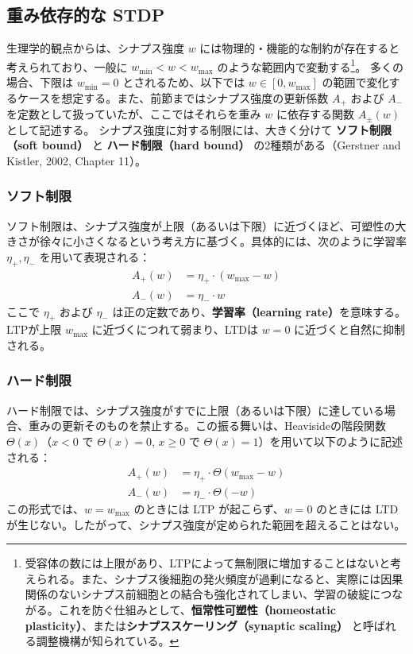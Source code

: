 \subsection{重み依存的な STDP}
生理学的観点からは、シナプス強度 $w$ には物理的・機能的な制約が存在すると考えられており、一般に $w_{\min} < w < w_{\max}$ のような範囲内で変動する\footnote{受容体の数には上限があり、LTPによって無制限に増加することはないと考えられる。また、シナプス後細胞の発火頻度が過剰になると、実際には因果関係のないシナプス前細胞との結合も強化されてしまい、学習の破綻につながる。これを防ぐ仕組みとして、\textbf{恒常性可塑性（homeostatic plasticity）}、または\textbf{シナプススケーリング（synaptic scaling）} と呼ばれる調整機構が知られている。}。
多くの場合、下限は $w_{\min} = 0$ とされるため、以下では $w \in [0, w_{\max}]$ の範囲で変化するケースを想定する。また、前節まではシナプス強度の更新係数 $A_+$ および $A_-$ を定数として扱っていたが、ここではそれらを重み $w$ に依存する関数 $A_{\pm}(w)$ として記述する。
シナプス強度に対する制限には、大きく分けて \textbf{ソフト制限（soft bound）} と \textbf{ハード制限（hard bound）} の2種類がある（Gerstner and Kistler, 2002, Chapter 11）。
\subsubsection{ソフト制限}
ソフト制限は、シナプス強度が上限（あるいは下限）に近づくほど、可塑性の大きさが徐々に小さくなるという考え方に基づく。具体的には、次のように学習率 $\eta_+, \eta_-$ を用いて表現される：
\begin{align}
A_+(w) &= \eta_+ \cdot (w_{\max} - w) \\
A_-(w) &= \eta_- \cdot w
\end{align}
ここで $\eta_+$ および $\eta_-$ は正の定数であり、\textbf{学習率（learning rate）}を意味する。LTPが上限 $w_{\max}$ に近づくにつれて弱まり、LTDは $w = 0$ に近づくと自然に抑制される。
\subsubsection{ハード制限}
ハード制限では、シナプス強度がすでに上限（あるいは下限）に達している場合、重みの更新そのものを禁止する。この振る舞いは、Heavisideの階段関数 $\Theta(x)$（$x < 0$ で $\Theta(x) = 0$, $x \geq 0$ で $\Theta(x) = 1$）を用いて以下のように記述される：
\begin{align}
A_+(w) &= \eta_+ \cdot \Theta(w_{\max} - w) \\
A_-(w) &= \eta_- \cdot \Theta(-w)
\end{align}
この形式では、$w = w_{\max}$ のときには LTP が起こらず、$w = 0$ のときには LTD が生じない。したがって、シナプス強度が定められた範囲を超えることはない。
